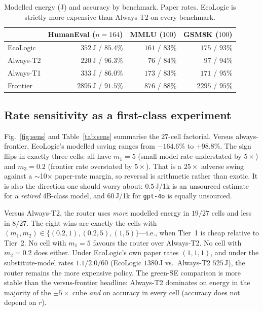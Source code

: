 \documentclass[10pt,conference]{IEEEtran}
\begin{document}
\begin{table}[t]
\caption{Modelled energy (J) and accuracy by benchmark. Paper rates. EcoLogic is strictly more expensive than Always-T2 on every benchmark.}
\label{tab:bench}
\centering
\setlength{\tabcolsep}{3.5pt}
\begin{tabular}{lrrr}
\toprule
 & HumanEval ($n=164$) & MMLU ($100$) & GSM8K ($100$) \\
\midrule
EcoLogic & $352$\,J / $85.4\%$ & $161$ / $83\%$ & $175$ / $93\%$ \\
Always-T2 & $220$\,J / $96.3\%$ & $76$ / $84\%$ & $97$ / $94\%$ \\
Always-T1 & $333$\,J / $86.0\%$ & $173$ / $83\%$ & $171$ / $95\%$ \\
Frontier & $2895$\,J / $91.5\%$ & $876$ / $88\%$ & $2295$ / $95\%$ \\
\bottomrule
\end{tabular}
\end{table}

\subsection{Rate sensitivity as a first-class experiment}

Fig.~\ref{fig:sens} and Table~\ref{tab:sens} summarise the $27$-cell factorial. Versus always-frontier, EcoLogic's modelled saving ranges from $-164.6\%$ to $+98.8\%$. The sign flips in exactly three cells: all have $m_1=5$ (small-model rate understated by $5\times$) and $m_3=0.2$ (frontier rate overstated by $5\times$). That is a $25\times$ adverse swing against a $\sim$10$\times$ paper-rate margin, so reversal is arithmetic rather than exotic. It is also the direction one should worry about: $0.5$\,J/1k is an unsourced estimate for a \emph{retired} 4B-class model, and $60$\,J/1k for \texttt{gpt-4o} is equally unsourced.

Versus Always-T2, the router uses \emph{more} modelled energy in $19/27$ cells and less in $8/27$. The eight wins are exactly the cells with $(m_1,m_2)\in\{(0.2,1),(0.2,5),(1,5)\}$---i.e., when Tier~1 is cheap relative to Tier~2. No cell with $m_1=5$ favours the router over Always-T2. No cell with $m_2=0.2$ does either. Under EcoLogic's own paper rates $(1,1,1)$, and under the substitute-model rates $1.1/2.0/60$ (EcoLogic $1380$\,J vs.\ Always-T2 $525$\,J), the router remains the more expensive policy. The green-SE comparison is more stable than the versus-frontier headline: Always-T2 dominates on energy in the majority of the $\pm5\times$ cube \emph{and} on accuracy in every cell (accuracy does not depend on $r$).
\end{document}
